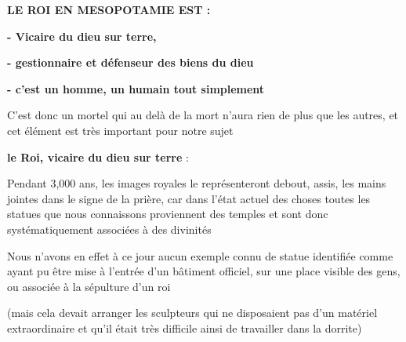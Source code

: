 \documentclass[a4paper]{article}
\begin{document}
\bigskip


\bigskip


\bigskip


\bigskip


\bigskip


\bigskip


\bigskip


\bigskip


\bigskip


\bigskip


\bigskip


\bigskip

{
\textbf{LE ROI EN MESOPOTAMIE EST :}}


\bigskip

{
\textbf{{}- Vicaire du dieu sur terre,}}

{
\textbf{{}- gestionnaire et défenseur des biens du dieu }}

{
\textbf{{}- c'est un homme, un humain tout simplement}}


\bigskip


\bigskip

{
C'est donc un mortel qui au delà de la mort n'aura rien de plus que les
autres, et cet élément est très important pour notre sujet}


\bigskip


\bigskip


\bigskip

{
\textbf{le Roi, vicaire du dieu sur terre} : \ }


\bigskip

{
Pendant 3,000 ans, les images royales le représenteront debout, assis,
les mains jointes dans le signe de la prière, car dans l'état actuel
des choses toutes les statues que nous connaissons proviennent des
temples et sont donc systématiquement associées à des divinités}

{
Nous n'avons en effet à ce jour aucun exemple connu de statue identifiée
comme ayant pu être mise à l'entrée d'un bâtiment officiel, sur une
place visible des gens, ou associée à la sépulture d'un roi}

{
(mais cela devait arranger les sculpteurs qui ne disposaient pas d'un
matériel extraordinaire et qu'il était très difficile ainsi de
travailler dans la dorrite)}


\bigskip
\end{document}
